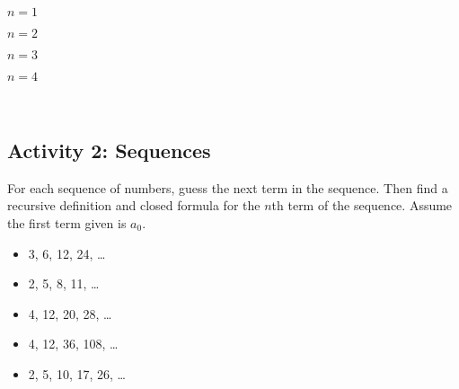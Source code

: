 \documentclass[11pt]{exam}
\def\v{circle (3pt)}
\begin{document}
  \begin{multicols}{5}
  \begin{center}
  
  $n = 1$
  \end{center}
  
  \columnbreak
    \begin{center}
    
    $n = 2$
    \end{center}
    
    \columnbreak
    
    \begin{center}
    
    $n = 3$
    \end{center}
    
    \columnbreak
    
        \begin{center}
        
        $n = 4$
        \end{center}
        
        \columnbreak
     
     ~
  \end{multicols}
\vfill

\newpage

\subsection*{Activity 2: Sequences}

For each sequence of numbers, guess the next term in  the sequence.  Then find a recursive definition and closed formula for the $n$th term of the sequence.  Assume the first term given is $a_0$.

\begin{itemize}
\item 3, 6, 12, 24, \ldots
\vfill
\item 2, 5, 8, 11, \ldots
\vfill
\item 4, 12, 20, 28, \ldots
\vfill
\item 4, 12, 36, 108, \ldots
\vfill
\item 2, 5, 10, 17, 26, \ldots 
\vfill
\end{itemize}
\end{document}
